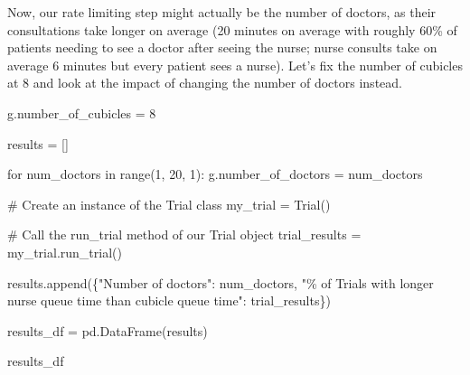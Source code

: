 \documentclass[
  letterpaper,
  DIV=11,
  numbers=noendperiod]{scrreprt}
\newenvironment{Shaded}{\begin{snugshade}}{\end{snugshade}}
\newcommand{\BuiltInTok}[1]{\textcolor[rgb]{0.00,0.23,0.31}{#1}}
\newcommand{\CommentTok}[1]{\textcolor[rgb]{0.37,0.37,0.37}{#1}}
\newcommand{\ControlFlowTok}[1]{\textcolor[rgb]{0.00,0.23,0.31}{#1}}
\newcommand{\DecValTok}[1]{\textcolor[rgb]{0.68,0.00,0.00}{#1}}
\newcommand{\KeywordTok}[1]{\textcolor[rgb]{0.00,0.23,0.31}{#1}}
\newcommand{\NormalTok}[1]{\textcolor[rgb]{0.00,0.23,0.31}{#1}}
\newcommand{\OperatorTok}[1]{\textcolor[rgb]{0.37,0.37,0.37}{#1}}
\newcommand{\SpecialCharTok}[1]{\textcolor[rgb]{0.37,0.37,0.37}{#1}}
\newcommand{\StringTok}[1]{\textcolor[rgb]{0.13,0.47,0.30}{#1}}
\begin{document}
Now, our rate limiting step might actually be the number of doctors, as
their consultations take longer on average (20 minutes on average with
roughly 60\% of patients needing to see a doctor after seeing the nurse;
nurse consults take on average 6 minutes but every patient sees a
nurse). Let's fix the number of cubicles at 8 and look at the impact of
changing the number of doctors instead.

\begin{Shaded}
\begin{Highlighting}[]
\NormalTok{g.number\_of\_cubicles }\OperatorTok{=} \DecValTok{8}

\NormalTok{results }\OperatorTok{=}\NormalTok{ []}

\ControlFlowTok{for}\NormalTok{ num\_doctors }\KeywordTok{in} \BuiltInTok{range}\NormalTok{(}\DecValTok{1}\NormalTok{, }\DecValTok{20}\NormalTok{, }\DecValTok{1}\NormalTok{):}
\NormalTok{    g.number\_of\_doctors }\OperatorTok{=}\NormalTok{ num\_doctors}

    \CommentTok{\# Create an instance of the Trial class}
\NormalTok{    my\_trial }\OperatorTok{=}\NormalTok{ Trial()}

    \CommentTok{\# Call the run\_trial method of our Trial object}
\NormalTok{    trial\_results }\OperatorTok{=}\NormalTok{ my\_trial.run\_trial()}

\NormalTok{    results.append(\{}\StringTok{"Number of doctors"}\NormalTok{: num\_doctors,}
      \StringTok{"}\SpecialCharTok{\% o}\StringTok{f Trials with longer nurse queue time than cubicle queue time"}\NormalTok{: trial\_results\})}

\NormalTok{results\_df }\OperatorTok{=}\NormalTok{ pd.DataFrame(results)}

\NormalTok{results\_df}
\end{Highlighting}
\end{Shaded}
\end{document}
